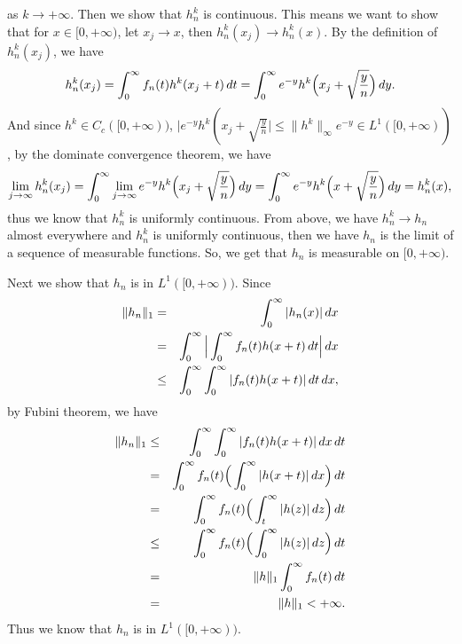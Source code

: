 \documentclass[12pt]{article}
\begin{document}
as $k \to + \infty$. Then we show that $h_{n}^{k}$ is continuous. This means we want to show that for $x \in [0, + \infty)$, let $x_{j} \to x$, then $h_{n}^{k} (x_{j}) \to h_{n}^{k} (x)$. By the definition of $h_{n}^{k} (x_{j})$, we have
\begin{equation*}
    h_{n}^{k} (x_{j}) = \int_{0}^{\infty} f_{n}(t) h^{k}(x_{j} + t) \, d t = \int_{0}^{\infty} e^{-y} h^{k} \Big{(} x_{j} + \sqrt{\frac{y}{n}} \Big{)} \, d y.
\end{equation*}
And since $h^{k} \in C_{c}([0, + \infty))$, $| e^{-y} h^{k} ( x_{j} + \sqrt{\frac{y}{n}} | \leq \|h^{k}\|_{\infty} e^{-y} \in L^{1}([0, + \infty))$, by the dominate convergence theorem, we have
\begin{equation*}
    \lim_{j \to \infty} h_{n}^{k} (x_{j}) = \int_{0}^{\infty} \lim_{j \to \infty} e^{-y} h^{k} \Big{(} x_{j} + \sqrt{\frac{y}{n}} \Big{)} \, d y = \int_{0}^{\infty} e^{-y} h^{k} \Big{(} x + \sqrt{\frac{y}{n}} \Big{)} \, d y = h_{n}^{k} (x),
\end{equation*}
thus we know that $h_{n}^{k}$ is uniformly continuous. From above, we have $h_{n}^{k} \to h_{n}$ almost everywhere and $h_{n}^{k}$ is uniformly continuous, then we have $h_{n}$ is the limit of a sequence of measurable functions. So, we get that $h_{n}$ is measurable on $[0, + \infty)$.

Next we show that $h_{n}$ is in $L^{1}([0, + \infty))$. Since
\begin{eqnarray*}
\|h_{n}\|_{1}  & = & \int_{0}^{\infty} |h_{n} (x)| \, d x  \\
 & = & \int_{0}^{\infty} \Big{|} \int_{0}^{\infty} f_{n} (t) h(x + t) \, d t  \Big{|} \, d x \\
 & \leq & \int_{0}^{\infty} \int_{0}^{\infty} | f_{n} (t) h(x + t) | \, d t \, d x, 
\end{eqnarray*}
by Fubini theorem, we have
\begin{eqnarray*}
\|h_{n}\|_{1}  & \leq & \int_{0}^{\infty} \int_{0}^{\infty} | f_{n} (t) h(x + t) | \, d x \, d t \\
& = & \int_{0}^{\infty} f_{n} (t) \Big{(} \int_{0}^{\infty}  | h(x + t) | \, d x \Big{)} \, d t \\
& = & \int_{0}^{\infty} f_{n} (t) \Big{(} \int_{t}^{\infty}  | h(z) | \, d z \Big{)} \, d t \\
& \leq & \int_{0}^{\infty} f_{n} (t) \Big{(} \int_{0}^{\infty}  | h(z) | \, d z \Big{)} \, d t \\
& = & \|h\|_{1} \int_{0}^{\infty} f_{n} (t) \, d t \\ 
& = & \|h\|_{1} < + \infty.
\end{eqnarray*}
Thus we know that $h_{n}$ is in $L^{1}([0, + \infty))$.
\end{document}
